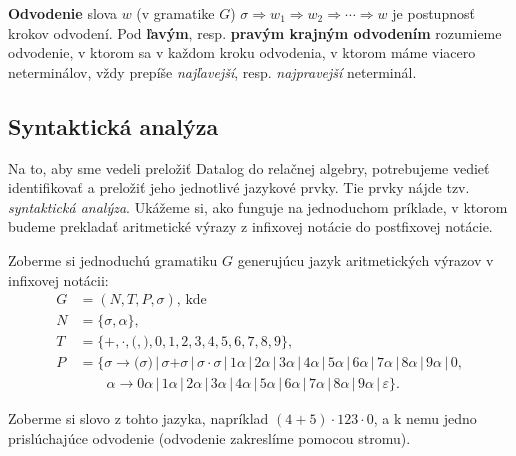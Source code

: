 \begin{definition}
    \textbf{Odvodenie} slova $w$ (v gramatike $G$) $\sigma \Rightarrow w_1 \Rightarrow w_2
    \Rightarrow \cdots \Rightarrow w$ je postupnosť krokov odvodení. Pod \textbf{ľavým}, resp.
    \textbf{pravým krajným odvodením} rozumieme odvodenie, v ktorom sa v každom kroku odvodenia, v
    ktorom máme viacero neterminálov, vždy prepíše \textit{najľavejší},
    resp. \textit{najpravejší} neterminál.
\end{definition}

\subsection{Syntaktická analýza}
Na to, aby sme vedeli preložiť Datalog do relačnej algebry, potrebujeme vedieť identifikovať a
preložiť jeho jednotlivé jazykové prvky. Tie prvky nájde tzv. \textit{syntaktická analýza}. Ukážeme
si, ako funguje na jednoduchom príklade, v ktorom budeme prekladať aritmetické výrazy z infixovej
notácie do postfixovej notácie.

Zoberme si jednoduchú gramatiku $G$ generujúcu jazyk aritmetických výrazov v infixovej notácii:
\begin{align*}
    G &= (N, T, P, \sigma)\text{, kde}\\
    N &= \{\sigma, \alpha\}\text{,}\\
    T &= \{\texttt{+}, \cdot, \texttt{(}, \texttt{)}, 0, 1, 2, 3, 4, 5, 6, 7, 8, 9\}\text{,}\\
    P &= \{\sigma \rightarrow \texttt{(}\sigma\texttt{)} \, | \, \sigma \texttt{+} \sigma \, | \, \sigma \cdot \sigma
                      \, | \, 1 \alpha \, | \, 2 \alpha \, | \, 3 \alpha
                      \, | \, 4 \alpha \, | \, 5 \alpha \, | \, 6 \alpha
                      \, | \, 7 \alpha \, | \, 8 \alpha \, | \, 9 \alpha
                      \, | \, 0,\\
      &\quad \quad \alpha \rightarrow 0 \alpha \, | \, 1 \alpha \, | \, 2 \alpha
                      \, | \, 3 \alpha \, | \, 4 \alpha \, | \, 5 \alpha
                      \, | \, 6 \alpha \, | \, 7 \alpha \, | \, 8 \alpha \, | \, 9 \alpha \, | \, \varepsilon
                      \}\text{.}
\end{align*}

Zoberme si slovo z tohto jazyka, napríklad $(4 + 5)\cdot 123 \cdot 0$, a k nemu jedno
prislúchajúce odvodenie (odvodenie zakreslíme pomocou stromu).

